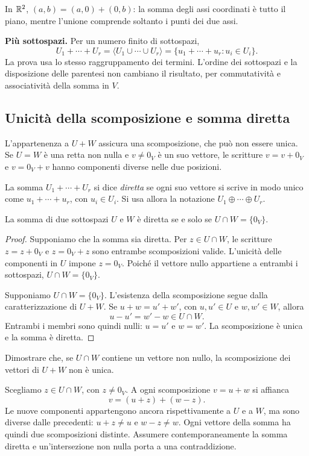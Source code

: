 \begin{esempio}
In $\mathbb{R}^2$, $(a,b)=(a,0)+(0,b)$: la somma degli assi coordinati è tutto il piano, mentre l'unione comprende soltanto i punti dei due assi.
\end{esempio}

\textbf{Più sottospazi.} Per un numero finito di sottospazi,
\[
  U_1+\cdots+U_r
  =\langle U_1\cup\cdots\cup U_r\rangle
  =\{u_1+\cdots+u_r:u_i\in U_i\}.
\]
La prova usa lo stesso raggruppamento dei termini. L'ordine dei sottospazi e la disposizione delle parentesi non cambiano il risultato, per commutatività e associatività della somma in $V$.

\subsection{Unicità della scomposizione e somma diretta}

L'appartenenza a $U+W$ assicura una scomposizione, che può non essere unica. Se $U=W$ è una retta non nulla e $v\ne0_V$ è un suo vettore, le scritture $v=v+0_V$ e $v=0_V+v$ hanno componenti diverse nelle due posizioni.

\begin{definizione}
La somma $U_1+\cdots+U_r$ si dice \emph{diretta} se ogni suo vettore si scrive in modo unico come $u_1+\cdots+u_r$, con $u_i\in U_i$. Si usa allora la notazione $U_1\oplus\cdots\oplus U_r$.
\end{definizione}

\begin{teorema}
La somma di due sottospazi $U$ e $W$ è diretta se e solo se $U\cap W=\{0_V\}$.
\end{teorema}
\begin{proof}
\passomath{\Rightarrow} Supponiamo che la somma sia diretta. Per $z\in U\cap W$, le scritture $z=z+0_V$ e $z=0_V+z$ sono entrambe scomposizioni valide. L'unicità delle componenti in $U$ impone $z=0_V$. Poiché il vettore nullo appartiene a entrambi i sottospazi, $U\cap W=\{0_V\}$.

\passomath{\Leftarrow} Supponiamo $U\cap W=\{0_V\}$. L'esistenza della scomposizione segue dalla caratterizzazione di $U+W$. Se $u+w=u'+w'$, con $u,u'\in U$ e $w,w'\in W$, allora
\[
  u-u'=w'-w\in U\cap W.
\]
Entrambi i membri sono quindi nulli: $u=u'$ e $w=w'$. La scomposizione è unica e la somma è diretta.
\end{proof}

\begin{esercizio}
Dimostrare che, se $U\cap W$ contiene un vettore non nullo, la scomposizione dei vettori di $U+W$ non è unica.
\end{esercizio}
\begin{svolgimento}
Scegliamo $z\in U\cap W$, con $z\ne0_V$. A ogni scomposizione $v=u+w$ si affianca
\[
  v=(u+z)+(w-z).
\]
Le nuove componenti appartengono ancora rispettivamente a $U$ e a $W$, ma sono diverse dalle precedenti: $u+z\ne u$ e $w-z\ne w$. Ogni vettore della somma ha quindi due scomposizioni distinte. Assumere contemporaneamente la somma diretta e un'intersezione non nulla porta a una contraddizione.
\end{svolgimento}

